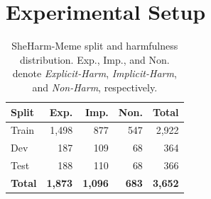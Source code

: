 \documentclass[11pt]{article}
\begin{document}
\section{Experimental Setup}
\label{sec:experiments}

\begin{table}[t]
\centering
\small
\setlength{\tabcolsep}{5pt}
\renewcommand{\arraystretch}{1.05}
\begin{tabular}{lrrrr}
\toprule
\textbf{Split} &
\textbf{Exp.} &
\textbf{Imp.} &
\textbf{Non.} &
\textbf{Total} \\
\midrule
Train & 1,498 & 877 & 547 & 2,922 \\
Dev   & 187   & 109 & 68  & 364 \\
Test  & 188   & 110 & 68  & 366 \\
\midrule
\textbf{Total}
& \textbf{1,873}
& \textbf{1,096}
& \textbf{683}
& \textbf{3,652} \\
\bottomrule
\end{tabular}
\caption{SheHarm-Meme split and harmfulness distribution.
Exp., Imp., and Non. denote \textit{Explicit-Harm},
\textit{Implicit-Harm}, and \textit{Non-Harm}, respectively.}
\label{tab:data-splits}
\end{table}

\end{document}
